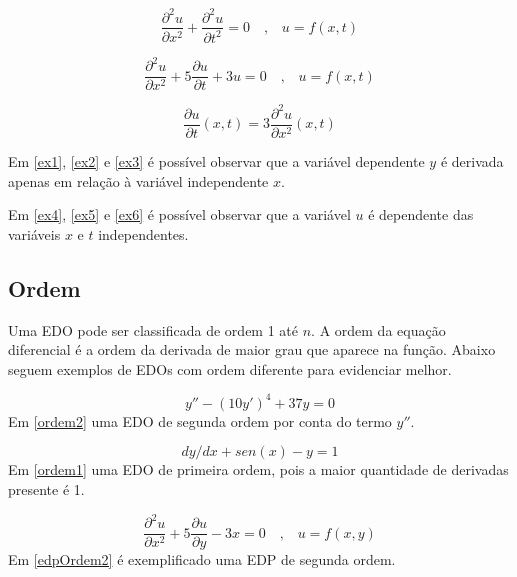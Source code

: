 \begin{equation}
\label{ex4}
\dfrac{\partial ^2u}{\partial x^2} + \dfrac{\partial ^2u}{\partial t^2} = 0  \quad \textrm{,} \quad  u = f(x,t)
\end{equation}

\begin{equation}
\label{ex5}
\dfrac{\partial^2u}{\partial x^2} + 5 \dfrac{\partial u}{\partial t} + 3u = 0 \quad \textrm{,} \quad   u = f(x,t)
\end{equation}

\begin{equation}
\label{ex6}
\dfrac{\partial u}{\partial t}(x,t) = 3 \dfrac{\partial^2u}{\partial x^2}(x,t) 
\end{equation}


Em \ref{ex1}, \ref{ex2} e \ref{ex3} é possível observar que a variável dependente $y$ é derivada apenas em relação à variável independente $x$.

Em \ref{ex4}, \ref{ex5} e \ref{ex6} é possível observar que a variável $u$ é dependente das variáveis $x$ e $t$ independentes.


\subsection[Ordem]{Ordem}

Uma EDO pode ser classificada de ordem 1 até $n$. A ordem da equação diferencial é a ordem da derivada de maior grau que aparece na função. Abaixo seguem exemplos de EDOs com ordem diferente para evidenciar melhor. 

\begin{equation}
\label{ordem2}
y'' - (10y')^4 + 37y = 0
\end{equation} 
\indent Em \ref{ordem2} uma EDO de segunda ordem por conta do termo $y''$.

\begin{equation}
\label{ordem1}
dy/dx + sen(x) - y = 1
\end{equation} 
\indent Em \ref{ordem1} uma EDO de primeira ordem, pois a maior quantidade de derivadas presente é 1.


\begin{equation}
\label{edpOrdem2}
\dfrac{\partial^2u}{\partial x^2} + 5 \dfrac{\partial u}{\partial y} - 3x = 0 \quad \textrm{,} \quad   u = f(x,y)
\end{equation} 
\indent Em \ref{edpOrdem2} é exemplificado uma EDP de segunda ordem.


